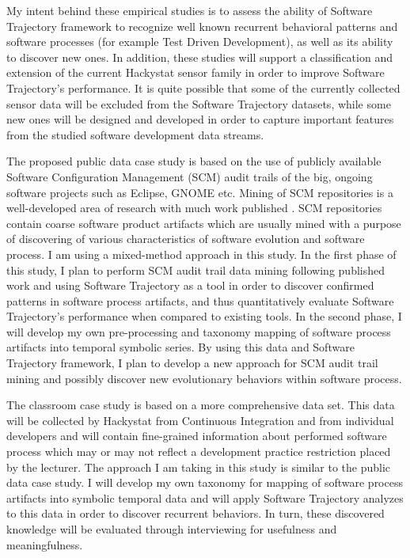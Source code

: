 \documentclass{sig-alternate}
\begin{document}
My intent behind these empirical studies is to assess the ability of Software Trajectory framework to recognize well known recurrent behavioral patterns and software processes (for example Test Driven Development), as well as its ability to discover new ones. In addition, these studies will support a classification and extension of the current Hackystat sensor family in order to improve Software Trajectory's performance. It is quite possible that some of the currently collected sensor data will be excluded from the Software Trajectory datasets, while some new ones will be designed and developed in order to capture important features from the studied software development data streams. 

The proposed public data case study is based on the use of publicly available Software Configuration Management (SCM) audit trails of the big, ongoing software projects such as Eclipse, GNOME etc. Mining of SCM repositories is a well-developed area of research with much work published \cite{citeulike:5043676}. SCM repositories contain coarse software product artifacts which are usually mined with a purpose of discovering of various characteristics of software evolution and software process. I am using a mixed-method approach in this study. In the first phase of this study, I plan to perform SCM audit trail data mining following published work and using Software Trajectory as a tool in order to discover confirmed patterns in software process artifacts, and thus quantitatively evaluate Software Trajectory's performance when compared to existing tools. In the second phase, I will develop my own pre-processing and taxonomy mapping of software process artifacts into temporal symbolic series. By using this data and Software Trajectory framework, I plan to develop a new approach for SCM audit trail mining and possibly discover new evolutionary behaviors within software process. 

The classroom case study is based on a more comprehensive data set. This data will be collected by Hackystat from Continuous Integration and from individual developers and will contain fine-grained information about performed software process which may or may not reflect a development practice restriction placed by the lecturer. The approach I am taking in this study is similar to the public data case study. I will develop my own taxonomy for mapping of software process artifacts into symbolic temporal data and will apply Software Trajectory analyzes to this data in order to discover recurrent behaviors. In turn, these discovered knowledge will be evaluated through interviewing for usefulness and meaningfulness. 
\end{document}

